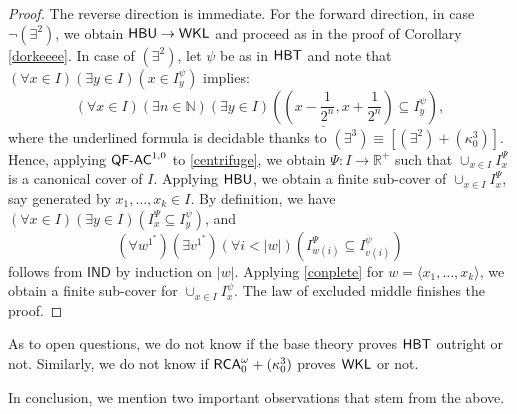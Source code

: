 \documentclass[reqno]{amsart}
\newtheorem{cor}[thm]{Corollary}
\newcommand\be{\begin{equation}}
\newcommand\ee{\end{equation}}
\def\RCAo{\textup{\textsf{RCA}}_{0}^{\omega}}
\def\WKL{\textup{\textsf{WKL}}}
\def\N{{\mathbb  N}}
\def\R{{\mathbb  R}}
\def\di{\rightarrow}
\def\QFAC{\textup{\textsf{QF-AC}}}
\def\HBU{\textup{\textsf{HBU}}}
\def\HBT{\textup{\textsf{HBT}}}
\numberwithin{equation}{section}
\numberwithin{thm}{section}
\begin{document}
\begin{proof}
The reverse direction is immediate.  For the forward direction, in case $\neg(\exists^{2})$, we obtain $\HBU\di \WKL$ and proceed as in the proof of Corollary \ref{dorkeeee}. 
In case of $(\exists^{2})$, let $\psi$ be as in $\HBT$ and note that $(\forall x\in I)(\exists y\in I)(x\in I_{y}^{\psi})$ implies:
\be\label{centrifuge}\textstyle
(\forall x\in I)(\exists n\in \N)\underline{(\exists y\in I)((x-\frac{1}{2^{n}}, x+\frac{1}{2^{n}})\subseteq I_{y}^{\psi})}, 
\ee
where the underlined formula is decidable thanks to $(\exists^{3})\equiv [(\exists^{2}) + (\kappa_{0}^{3})]$.
Hence, applying $\QFAC^{1,0}$ to \eqref{centrifuge}, we obtain $\Psi:I\di \R^{+}$ such that $\cup_{x\in I}I_{x}^{\Psi}$ is a canonical cover of $I$.  
Applying $\HBU$, we obtain a finite sub-cover of $\cup_{x\in I}I_{x}^{\Psi}$, say generated by $x_{1}, \dots, x_{k}\in I $.  
By definition, we have $(\forall x\in I)(\exists y\in I)(I^{\Psi}_{x}\subseteq I_{y}^{\psi})$, and 
\be\label{conplete}
(\forall w^{1^{*}})(\exists v^{1^{*}})(\forall i<|w|)(I^{\Psi}_{w(i)}\subseteq I_{v(i)}^{\psi})
\ee
follows from $\textsf{IND}$ by induction on $|w|$.  Applying \eqref{conplete} for $w=\langle x_{1}, \dots, x_{k}\rangle$, we obtain a finite sub-cover for $\cup_{x\in I}I_{x}^{\psi}$. The law of excluded middle finishes the proof. 
\end{proof}
As to open questions, we do not know if the base theory proves $\HBT$ outright or not.  
Similarly, we do not know if $\RCAo+(\kappa_{0}^{3})$ proves $\WKL$ or not.  

\smallskip

In conclusion, we mention two important observations that stem from the above.
\end{document}
